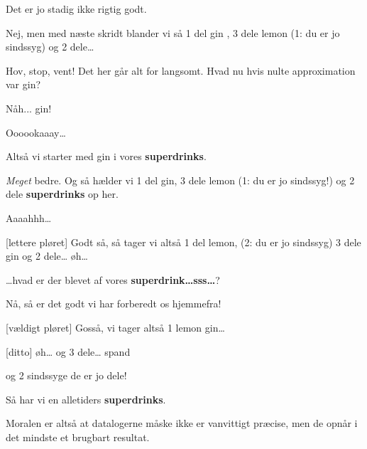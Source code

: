 \documentclass[a4paper,11pt]{article}
\newcommand{\sd}{\textbf{superdrinks}}
\begin{document}
\begin{sketch}
   Det er jo stadig ikke rigtig godt.

   Nej, men med næste skridt blander vi så 1 del gin , 3 dele lemon (1: du er jo sindssyg)  og 2
  dele\ldots

    Hov, stop, vent! Det her går
  alt for langsomt. Hvad nu hvis nulte approximation var gin?

    Nåh... gin!

   Oooookaaay\ldots

   Altså vi starter med gin i vores \sd.


   \emph{Meget} bedre.  Og så
  hælder vi 1 del gin, 3 dele lemon (1: du er jo sindssyg!) og 2 dele \sd{} op her.


   Aaaahhh\ldots

  [lettere pløret] Godt så, så tager vi altså 1 del lemon, (2: du er jo sindssyg) 3
  dele gin og 2 dele\ldots{} øh\ldots {}

   \ldots{}hvad er der blevet af vores
  \textbf{superdrink\ldots{}sss\ldots}?

    Nå, så er det godt vi har forberedt os
  hjemmefra!


  [vældigt pløret] Gosså, vi tager altså 1 lemon gin\ldots

  [ditto] øh\ldots{} og 3 dele\ldots{} spand

   og 2 sindssyge de er jo dele!

   Så har vi en alletiders \sd. 


   Moralen er altså at datalogerne måske ikke er vanvittigt
  præcise, men de opnår i det mindste et brugbart resultat.







\end{sketch}
\end{document}

